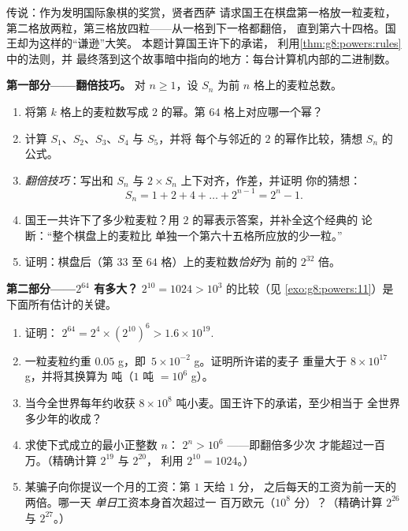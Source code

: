\begin{problem}[{周末问题——等比数列求和
$1 + 2 + 4 + \dots + 2^{n-1} = 2^n - 1$，由一个著名传说通向
二进制数}]
\label{pb:g8:powers:1}
传说：作为发明国际象棋的奖赏，贤者西萨
请求国王在棋盘第一格放一粒麦粒，
第二格放两粒，第三格放四粒——从一格到下一格都翻倍，
直到第六十四格。国王却为这样的“谦逊”大笑。
本题计算国王许下的承诺，
利用\cref{thm:g8:powers:rules}中的法则，并
最终落到这个故事暗中指向的地方：每台计算机内部的二进制数。

\medskip
\noindent\textbf{第一部分——翻倍技巧。}
对 $n \geq 1$，设 $S_n$ 为前
$n$ 格上的麦粒总数。
\begin{enumerate}
  \item 将第 $k$ 格上的麦粒数写成
        $2$ 的幂。第 $64$ 格上对应哪一个幂？
  \item 计算 $S_1$、$S_2$、$S_3$、$S_4$ 与 $S_5$，并将
        每个与邻近的 $2$ 的幂作比较，猜想
        $S_n$ 的公式。
  \item \emph{翻倍技巧}：写出和 $S_n$ 与
        $2 \times S_n$ 上下对齐，作差，并证明
        你的猜想：
        \[
        S_n = 1 + 2 + 4 + \dots + 2^{n-1} = 2^n - 1 .
        \]
  \item 国王一共许下了多少粒麦粒？用
        $2$ 的幂表示答案，并补全这个经典的
        论断：“整个棋盘上的麦粒比
        单独一个第六十五格所应放的少一粒。”
  \item 证明：棋盘后（第 $33$ 至
        $64$ 格）上的麦粒数\emph{恰好}为
        前的 $2^{32}$ 倍。
\end{enumerate}

\medskip
\noindent\textbf{第二部分——$2^{64}$ 有多大？}
$2^{10} = 1024 > 10^3$ 的比较（见
\cref{exo:g8:powers:11}）是下面所有估计的关键。
\begin{enumerate}[resume]
  \item 证明：
        $2^{64} = 2^4 \times \left(2^{10}\right)^6 > 1.6 \times
        10^{19}$.
  \item 一粒麦粒约重 $0.05$ g，即\
        $5 \times 10^{-2}$ g。证明所许诺的麦子
        重量大于 $8 \times 10^{17}$ g，并将其换算为
        吨（$1$ 吨 $= 10^6$ g）。
  \item 当今全世界每年约收获 $8 \times 10^8$
        吨小麦。国王许下的承诺，至少相当于
        全世界多少年的收成？
  \item 求使下式成立的最小正整数 $n$：
        $2^n > 10^6$ ——即翻倍多少次
        才能超过一百万。（精确计算 $2^{19}$ 与 $2^{20}$，
        利用 $2^{10} = 1024$。）
  \item 某骗子向你提议一个月的工资：第 $1$ 天给 $1$ 分，
        之后每天的工资为前一天的两倍。哪一天
        \emph{单日}工资本身首次超过一
        百万欧元（$10^8$ 分）？（精确计算 $2^{26}$ 与
        $2^{27}$。）
\end{enumerate}


\end{problem}
